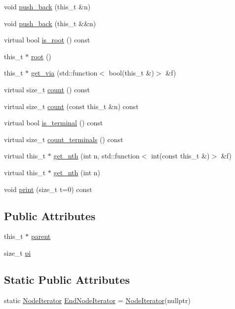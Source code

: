 \begin{DoxyCompactItemize}
\item 
void \hyperlink{class_base_node_ab5a808e3ec22f8061022f9ec286d4a03}{push\+\_\+back} (this\+\_\+t \&n)
\item 
void \hyperlink{class_base_node_a6971173d807967deda4501eb70676533}{push\+\_\+back} (this\+\_\+t \&\&n)
\item 
virtual bool \hyperlink{class_base_node_afce604388d562d347fcb31aeb2a8ef03}{is\+\_\+root} () const
\item 
this\+\_\+t $\ast$ \hyperlink{class_base_node_ab953456c09fa01bbf8a29c07f4d2b5ad}{root} ()
\item 
this\+\_\+t $\ast$ \hyperlink{class_base_node_add31235ad96e659230cbca6c9e357523}{get\+\_\+via} (std\+::function$<$ bool(this\+\_\+t \&)$>$ \&f)
\item 
virtual size\+\_\+t \hyperlink{class_base_node_a4007d1c72991b8599a6ff5a21c054ba5}{count} () const
\item 
virtual size\+\_\+t \hyperlink{class_base_node_aaaf113bd98ee404e71582ac1cf014ac0}{count} (const this\+\_\+t \&n) const
\item 
virtual bool \hyperlink{class_base_node_af37331cbec1b32c874138d2ae9b89745}{is\+\_\+terminal} () const
\item 
virtual size\+\_\+t \hyperlink{class_base_node_adb6326eefe4ddc311651b4a4a5cb119e}{count\+\_\+terminals} () const
\item 
virtual this\+\_\+t $\ast$ \hyperlink{class_base_node_a1e4560f882d4cdb713aea5178a4e2d86}{get\+\_\+nth} (int n, std\+::function$<$ int(const this\+\_\+t \&)$>$ \&f)
\item 
virtual this\+\_\+t $\ast$ \hyperlink{class_base_node_a9381814fdc86029905dc283da5d3d931}{get\+\_\+nth} (int n)
\item 
void \hyperlink{class_base_node_acbfcc951fe5858d0c85a5b3dc8843f05}{print} (size\+\_\+t t=0) const
\end{DoxyCompactItemize}
\subsection*{Public Attributes}
\begin{DoxyCompactItemize}
\item 
this\+\_\+t $\ast$ \hyperlink{class_base_node_aa1ad671f67931a82120d5852520417b7}{parent}
\item 
size\+\_\+t \hyperlink{class_base_node_a6e2caf1ce4e3f0436c277b7331dbd554}{pi}
\end{DoxyCompactItemize}
\subsection*{Static Public Attributes}
\begin{DoxyCompactItemize}
\item 
static \hyperlink{class_base_node_1_1_node_iterator}{Node\+Iterator} \hyperlink{class_base_node_ac8a2fe45180446f4db2d4742c34b5b80}{End\+Node\+Iterator} = \hyperlink{class_base_node_1_1_node_iterator}{Node\+Iterator}(nullptr)
\end{DoxyCompactItemize}
